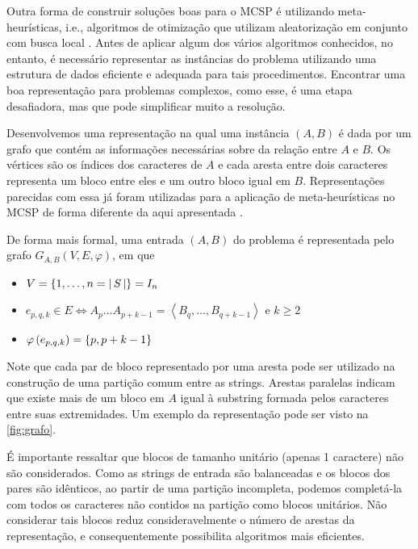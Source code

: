 Outra forma de construir soluções boas para o MCSP é utilizando meta-heurísticas, i.e., algoritmos de otimização que utilizam aleatorização em conjunto com busca local \cite[p.~4]{yang_nature-inspired_2010}. Antes de aplicar algum dos vários algoritmos conhecidos, no entanto, é necessário representar as instâncias do problema utilizando uma estrutura de dados eficiente e adequada para tais procedimentos. Encontrar uma boa representação para problemas complexos, como esse, é uma etapa desafiadora, mas que pode simplificar muito a resolução.

Desenvolvemos uma representação na qual uma instância $(A, B)$ é dada por um grafo que contém as informações necessárias sobre da relação entre $A$ e $B$. Os vértices são os índices dos caracteres de $A$ e cada aresta entre dois caracteres representa um bloco entre eles e um outro bloco igual em $B$. Representações parecidas com essa já foram utilizadas para a aplicação de meta-heurísticas no MCSP de forma diferente da aqui apresentada \cite{ferdous_solving_2013}.

De forma mais formal, uma entrada $(A, B)$ do problema é representada pelo grafo $G_{A, B}(V, E, \varphi)$, em que

\begin{itemize}
    \item $V = \set{ 1, \ldots, n = \abs{S}} = I_n$
    \item $e_{p, q, k} \in E \iff A_p \ldots A_{p + k - 1} = \left\langle B_q, \ldots, B_{q + k - 1} \right\rangle \text{ e } k \geq 2$
    \item $\varphi\left(e_{p, q, k}\right) = \set{p, p + k - 1}$
\end{itemize}

Note que cada par de bloco representado por uma aresta pode ser utilizado na construção de uma partição comum entre as strings. Arestas paralelas indicam que existe mais de um bloco em $A$ igual à substring formada pelos caracteres entre suas extremidades. Um exemplo da representação pode ser visto na \cref{fig:grafo}.

É importante ressaltar que blocos de tamanho unitário (apenas 1 caractere) não são considerados. Como as strings de entrada são balanceadas e os blocos dos pares são idênticos, ao partir de uma partição incompleta, podemos completá-la com todos os caracteres não contidos na partição como blocos unitários. Não considerar tais blocos reduz consideravelmente o número de arestas da representação, e consequentemente possibilita algoritmos mais eficientes.

